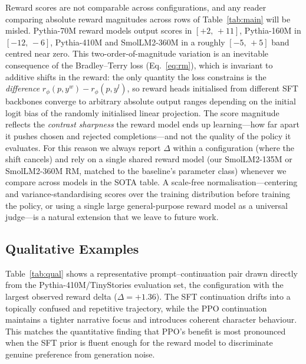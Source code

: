 \documentclass[10pt,twocolumn,letterpaper]{article}
\begin{document}
Reward scores are not comparable across configurations, and any reader comparing absolute reward magnitudes across rows of Table~\ref{tab:main} will be misled. Pythia-70M reward models output scores in $[+2,\,+11]$, Pythia-160M in $[-12,\,-6]$, Pythia-410M and SmolLM2-360M in a roughly $[-5,\,+5]$ band centred near zero. This two-order-of-magnitude variation is an inevitable consequence of the Bradley--Terry loss (Eq.~\ref{eq:rm}), which is invariant to additive shifts in the reward: the only quantity the loss constrains is the \emph{difference} $r_\phi(p,y^w)-r_\phi(p,y^l)$, so reward heads initialised from different SFT backbones converge to arbitrary absolute output ranges depending on the initial logit bias of the randomly initialised linear projection. The score magnitude reflects the \emph{contrast sharpness} the reward model ends up learning---how far apart it pushes chosen and rejected completions---and not the quality of the policy it evaluates. For this reason we always report $\Delta$ within a configuration (where the shift cancels) and rely on a single shared reward model (our SmolLM2-135M or SmolLM2-360M RM, matched to the baseline's parameter class) whenever we compare across models in the SOTA table. A scale-free normalisation---centering and variance-standardising scores over the training distribution before training the policy, or using a single large general-purpose reward model as a universal judge---is a natural extension that we leave to future work.

\subsection{Qualitative Examples}

Table~\ref{tab:qual} shows a representative prompt--continuation pair drawn directly from the Pythia-410M/TinyStories evaluation set, the configuration with the largest observed reward delta ($\Delta=+1.36$). The SFT continuation drifts into a topically confused and repetitive trajectory, while the PPO continuation maintains a tighter narrative focus and introduces coherent character behaviour. This matches the quantitative finding that PPO's benefit is most pronounced when the SFT prior is fluent enough for the reward model to discriminate genuine preference from generation noise.
\end{document}

